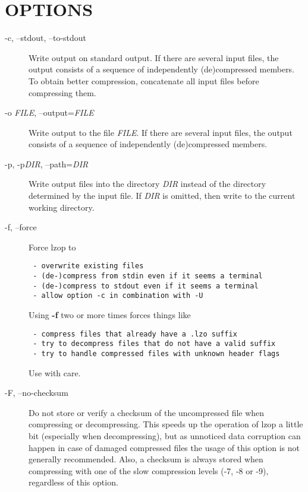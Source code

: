 \section{OPTIONS\label{OPTIONS}}
\begin{description}

\item[{-c, --stdout, --to-stdout}] \mbox{}

Write output on standard output. If there are several
input files, the output consists of a sequence
of independently (de)compressed members. To obtain
better compression, concatenate all input files
before compressing them.


\item[{-o \textit{FILE}, --output=\textit{FILE}}] \mbox{}

Write output to the file \textit{FILE}. If there are several
input files, the output consists of a sequence
of independently (de)compressed members.


\item[{-p, -p\textit{DIR}, --path=\textit{DIR}}] \mbox{}

Write output files into the directory \textit{DIR} instead
of the directory determined by the input file. If
\textit{DIR} is omitted, then write to the current working
directory.


\item[{-f, --force}] \mbox{}

Force lzop to

\begin{verbatim}
 - overwrite existing files
 - (de-)compress from stdin even if it seems a terminal
 - (de-)compress to stdout even if it seems a terminal
 - allow option -c in combination with -U
\end{verbatim}


Using \textbf{-f} two or more times forces things like

\begin{verbatim}
 - compress files that already have a .lzo suffix
 - try to decompress files that do not have a valid suffix
 - try to handle compressed files with unknown header flags
\end{verbatim}


Use with care.


\item[{-F, --no-checksum}] \mbox{}

Do not store or verify a checksum of the uncompressed
file when compressing or decompressing.
This speeds up the operation of lzop a little bit (especially
when decompressing), but as unnoticed data corruption can happen
in case of damaged compressed files the usage of this option
is not generally recommended.
Also, a checksum is always stored when
compressing with one of the slow compression levels (-7, -8 or -9),
regardless of this option.



\end{description}
